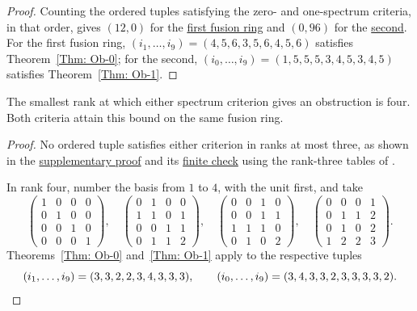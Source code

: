 \documentclass{amsart}
\begin{document}
\begin{proof}
Counting the ordered tuples satisfying the zero- and one-spectrum criteria, in that order, gives $(12,0)$ for the \href{https://github.com/sebastienpalcoux/triangular-prism-categorification/blob/f816c697fde088b261e1fe1ce703980e5dbdab51/data/rank6_zero_only.json}{first fusion ring} and $(0,96)$ for the \href{https://github.com/sebastienpalcoux/triangular-prism-categorification/blob/f816c697fde088b261e1fe1ce703980e5dbdab51/data/rank6_one_only.json}{second}. For the first fusion ring, $(i_1,\ldots,i_9)=(4,5,6,3,5,6,4,5,6)$ satisfies Theorem~\ref{Thm: Ob-0}; for the second, $(i_0,\ldots,i_9)=(1,5,5,5,3,4,5,3,4,5)$ satisfies Theorem~\ref{Thm: Ob-1}.
\end{proof}

\begin{proposition}\label{prop:spectrum-rank}
The smallest rank at which either spectrum criterion gives an obstruction is four. Both criteria attain this bound on the same fusion ring.
\end{proposition}
\begin{proof}
No ordered tuple satisfies either criterion in ranks at most three, as shown in the \href{https://github.com/sebastienpalcoux/triangular-prism-categorification/blob/f816c697fde088b261e1fe1ce703980e5dbdab51/SPECTRUM_RANK.md}{supplementary proof} and its \href{https://github.com/sebastienpalcoux/triangular-prism-categorification/blob/f816c697fde088b261e1fe1ce703980e5dbdab51/verify_spectrum_rank.py}{finite check} using the rank-three tables of \cite[Proposition~3.1]{Os15}.

In rank four, number the basis from $1$ to $4$, with the unit first, and take
\[
\begin{pmatrix}1&0&0&0\\0&1&0&0\\0&0&1&0\\0&0&0&1\end{pmatrix},\quad
\begin{pmatrix}0&1&0&0\\1&1&0&1\\0&0&1&1\\0&1&1&2\end{pmatrix},\quad
\begin{pmatrix}0&0&1&0\\0&0&1&1\\1&1&1&0\\0&1&0&2\end{pmatrix},\quad
\begin{pmatrix}0&0&0&1\\0&1&1&2\\0&1&0&2\\1&2&2&3\end{pmatrix}.
\]
Theorems~\ref{Thm: Ob-0} and~\ref{Thm: Ob-1} apply to the respective tuples
\[
(i_1,\ldots,i_9)=(3,3,2,2,3,4,3,3,3),\qquad
(i_0,\ldots,i_9)=(3,4,3,3,2,3,3,3,3,2).\qedhere
\]
\end{proof}
\end{document}
